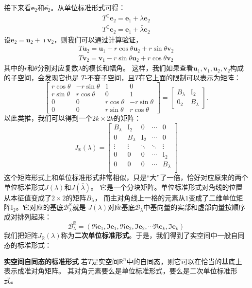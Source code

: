 \documentclass[12pt,UTF8]{ctexbook}
\begin{document}
接下来看$\mathbf{e}_2$和$\overline{\mathbf{e}_2}$。从单位标准形式可得：
\begin{align*}
    T^\mathbb{C}\mathbf{e}_2 = \mathbf{e}_1 + \lambda \mathbf{e}_2  \\
    T^\mathbb{C}\overline{\mathbf{e}_2} = \overline{\mathbf{e}_1} + \bar{\lambda} \overline{\mathbf{e}_2} 
\end{align*}
设$\mathbf{e}_2 = \mathbf{u}_2 + \imath \mathbf{v}_2$，则我们可以通过计算验证，
\begin{align*}
    T \mathbf{u}_2 = \mathbf{u}_1 + r\cos\theta \mathbf{u}_2 + r\sin\theta \mathbf{v}_2  \\
    T \mathbf{v}_2 = \mathbf{v}_1 - r\sin\theta \mathbf{u}_2 + r\cos\theta \mathbf{v}_2 
\end{align*}
其中的$r$和$\theta$分别对应复数$\lambda$的模长和幅角。
这样，我们如果查看$\mathbf{u}_1, \mathbf{v}_1, \mathbf{u}_2, \mathbf{v}_2$构成的子空间，会发现它也是
$T$-不变子空间，且$T$在它上面的限制可以表示为矩阵：
$$ \begin{bmatrix}
    r\cos\theta & -r\sin\theta & 1 & 0 \\ r\sin\theta & r\cos\theta & 0 & 1 \\
    0 & 0 & r\cos\theta & -r\sin\theta \\ 0 & 0 & r\sin\theta & r\cos\theta
\end{bmatrix} = \begin{bmatrix}
    B_\lambda & \mathrm{I}_2 \\ 0_2 & B_\lambda
\end{bmatrix}.$$
以此类推，我们可以得到一个$2k \times 2k$的矩阵：
$$ J_\mathbb{R}(\lambda) = \begin{bmatrix}
    B_\lambda & \mathrm{I}_2 & 0 & \cdots & 0 \\
    0 & B_\lambda & \mathrm{I}_2 & \cdots & 0 \\
    \vdots & \vdots & \ddots & \ddots & \vdots  \\
    0 & 0 & 0 & \cdots & \mathrm{I}_2  \\
    0 & 0 & 0 & \cdots & B_\lambda \\
   \end{bmatrix} $$
这个矩阵形式上和单位标准形式非常相似，只是“大”了一倍，恰好对应原来的两个单位标准形式$J(\lambda)$和$J(\bar{\lambda})$。
它是一个分块矩阵。单位标准形式对角线的位置从本征值变成了$2\times 2$的矩阵$B_\lambda$，
而主对角线上一格的元素从$1$变成了二维单位矩阵$\mathrm{I}_2$。它对应的基底$\mathcal{B}_\lambda^\mathbb{R}$就是
$J(\lambda)$对应基底$\mathcal{B}_\lambda$中基向量的实部和虚部向量按顺序成对排列起来：
$$\mathcal{B}_\lambda^\mathbb{R} = (\Re\mathbf{e}_1, \Im\mathbf{e}_1, \Re\mathbf{e}_2, \Im\mathbf{e}_2, \cdots \Re\mathbf{e}_k, \Im\mathbf{e}_k)$$
我们把矩阵$J_\mathbb{R}(\lambda)$称为\textbf{二次单位标准形式}。于是，我们得到了实空间中一般自同态的标准形式：
\begin{pp}\textbf{实空间自同态的标准形式 }\label{pp:9_11}
    若$T$是实空间$\mathbb{R}^n$中的自同态，则它可以在恰当的基底上表示成准对角矩阵。
    其对角元素要么是单位标准形式，要么是二次单位标准形式。
\end{pp}
\end{document}

